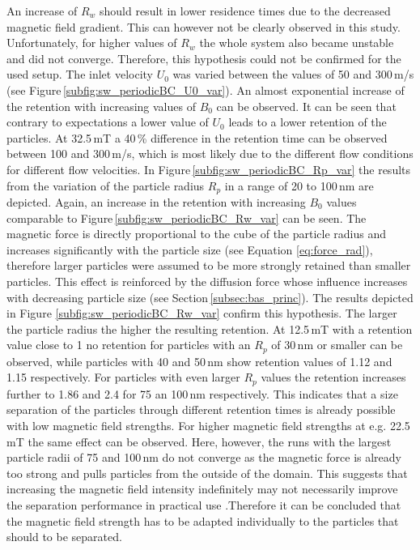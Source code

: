 An increase of $R_{w}$ should result in lower residence times due to the decreased magnetic field gradient. This can however not be clearly observed in this study. Unfortunately, for higher values of $R_{w}$ the whole system also became unstable and did not converge. Therefore, this hypothesis could not be confirmed for the used setup. The inlet velocity $U_{0}$ was varied between the values of 50 and 300\,\textmu m/s (see Figure\,\ref{subfig:sw_periodicBC_U0_var}). An almost exponential increase of the retention with increasing values of $B_{0}$ can be observed. It can be seen that contrary to expectations a lower value of $U_{0}$ leads to a lower retention of the particles. At 32.5\,mT a 40\,\% difference in the retention time can be observed between 100 and 300\,\textmu m/s, which is most likely due to the different flow conditions for different flow velocities. In Figure\,\ref{subfig:sw_periodicBC_Rp_var} the results from the variation of the particle radius $R_{p}$ in a range of 20 to 100\,nm are depicted. Again, an increase in the retention with increasing $B_{0}$ values comparable to Figure\,\ref{subfig:sw_periodicBC_Rw_var} can be seen. The magnetic force is directly proportional to the cube of the particle radius and increases significantly with the particle size (see Equation \ref{eq:force_rad}), therefore larger particles were assumed to be more strongly retained than smaller particles. This effect is reinforced by the diffusion force whose influence increases with decreasing particle size (see Section\,\ref{subsec:bas_princ}). The results depicted in Figure \ref{subfig:sw_periodicBC_Rw_var} confirm this hypothesis. The larger the particle radius the higher the resulting retention. At 12.5\,mT with a retention value close to 1 no retention for particles with an $R_{p}$ of 30\,nm or smaller can be observed, while particles with 40 and 50\,nm show retention values of 1.12 and 1.15 respectively. For particles with even larger $R_{p}$ values the retention increases further to 1.86 and 2.4 for 75 an 100\,nm respectively. This indicates that a size separation of the particles through different retention times is already possible with low magnetic field strengths. For higher magnetic field strengths at e.g. 22.5\,mT the same effect can be observed. Here, however, the runs with the largest particle radii of 75 and 100\,nm do not converge as the magnetic force is already too strong and pulls particles from the outside of the domain. This suggests that increasing the magnetic field intensity indefinitely may not necessarily improve the separation performance in practical use \cite{ge2017magnetic}.Therefore it can be concluded that the magnetic field strength has to be adapted individually to the particles that should to be separated.\\ 

